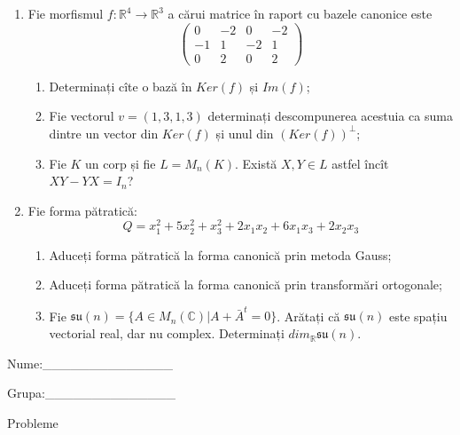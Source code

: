\documentclass{article}
\begin{document}
\begin{enumerate}
 \item Fie morfismul $f:\mathbb{R}^4 \to \mathbb{R}^3$ a cărui matrice în raport cu bazele canonice este
$$\begin{pmatrix}
0&-2&0&-2\\
-1&1&-2&1\\
0&2&0&2
\end{pmatrix}$$

\begin{enumerate}
\item Determinați cîte o bază în $Ker(f)$ și $Im(f)$;
\item Fie vectorul $v=(1,3,1,3)$ determinați descompunerea acestuia ca suma dintre un vector din $Ker(f)$ și unul din $(Ker(f))^\perp$;
\item Fie $K$ un corp și fie $L=M_n(K)$. Există $X,Y \in L$ astfel încît $XY-YX=I_n$?  
\end{enumerate}
\item Fie forma pătratică:
$$Q= x_1^2+5x_2^2+x_3^2+2x_1x_2+6x_1x_3+2x_2x_3$$

\begin{enumerate}
\item Aduceți forma pătratică la forma canonică prin metoda Gauss;
\item Aduceți forma pătratică la forma canonică prin transformări ortogonale;
\item Fie $\mathfrak{su}(n)=\{ A \in M_n(\mathbb{C}) | A+\bar{A}^t=0\}$. Arătați că $\mathfrak{su}(n)$ este spațiu vectorial real, dar nu complex.
Determinați $dim_{\mathbb{R}}\mathfrak{su}(n)$.
\end{enumerate}
\end{enumerate}
\newpage
\begin{flushright}
Nume:\_\_\_\_\_\_\_\_\_\_\_\_\_\_
 
 
Grupa:\_\_\_\_\_\_\_\_\_\_\_\_\_\_
\end{flushright}
\begin{center}
\vspace{2cm}
{\Large Probleme}
\vspace{2cm}
\end{center}
\end{document}
